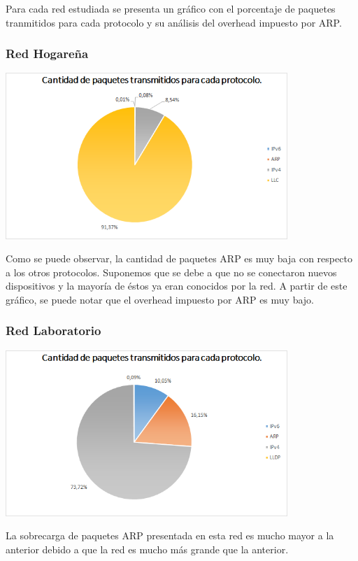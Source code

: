 Para cada red estudiada se presenta un gráfico con el porcentaje de paquetes tranmitidos para cada protocolo y su análisis del overhead impuesto por ARP.

\subsubsection{Red Hogareña}

\centerline{\includegraphics[width=0.8\textwidth]{./graficos/paquetesVSProtocolo/casa_mari2.png}}

Como se puede observar, la cantidad de paquetes ARP es muy baja con respecto a los otros protocolos. Suponemos que se debe a que no se conectaron nuevos dispositivos y la mayoría de éstos ya eran conocidos por la red. A partir de este gráfico, se puede notar que el overhead impuesto por ARP es muy bajo.

\subsubsection{Red Laboratorio}

\centerline{\includegraphics[width=0.8\textwidth]{./graficos/paquetesVSProtocolo/labo52.png}}
	
La sobrecarga de paquetes ARP presentada en esta red es mucho mayor a la anterior debido a que la red es mucho más grande que la anterior.

